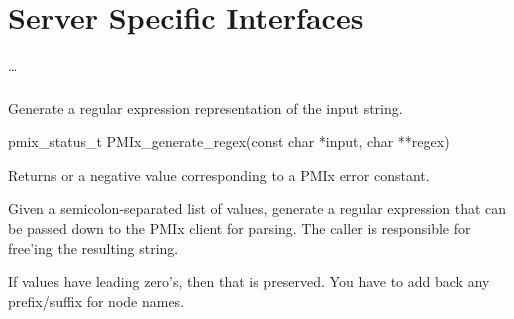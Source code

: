 \chapter{Server Specific Interfaces}
\label{chap:api_server}

\ldots


\subsection{}

\summary

Generate a regular expression representation of the input string.

\format

\cspecificstart
\begin{codepar}
pmix_status_t PMIx_generate_regex(const char *input, char **regex)
\end{codepar}
\cspecificend

\begin{arglist}
\end{arglist}

Returns  or a negative value corresponding to a PMIx error constant.

\descr

Given a semicolon-separated list of  values, generate a regular expression that can be passed down to the \ac{PMIx} client for parsing.
The caller is responsible for free'ing the resulting string.

If values have leading zero's, then that is preserved.
You have to add back any prefix/suffix for node names.



\subsection{}

